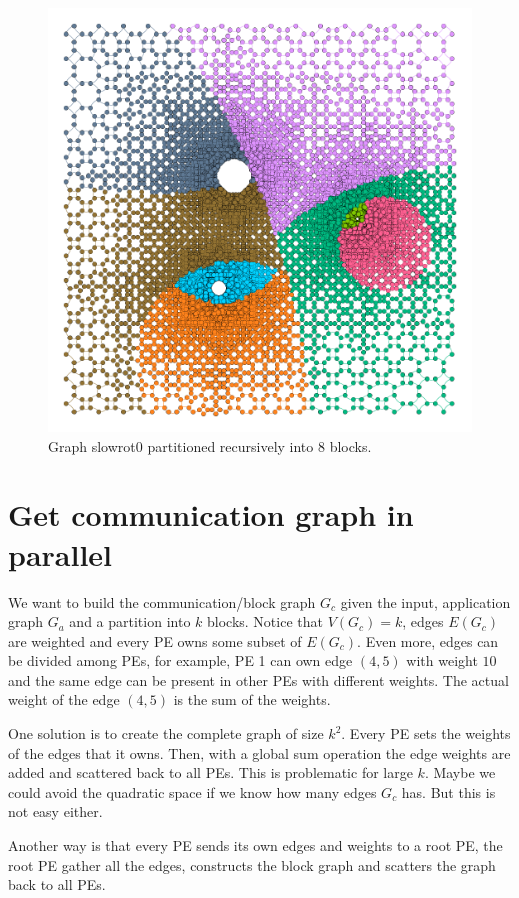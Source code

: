 \documentclass[a4paper,10pt]{article}
\begin{document}
\begin{figure}
\includegraphics[scale=0.2]{slowrot_RecursiveKMeans_k8}
\caption{Graph slowrot0 partitioned recursively into 8 blocks. }
\end{figure}



\section*{Get communication graph in parallel}

We want to build the communication/block graph $G_c$ given the input, application graph $G_a$ and a
partition into $k$ blocks. Notice that $V(G_c)=k$, edges $E(G_c)$ are weighted and every PE owns some subset 
of $E(G_c)$. Even more,
edges can be divided among PEs, for example, PE 1 can own edge $(4,5)$ with weight $10$ and the same
edge can be present in other PEs with different weights. The actual weight of the edge $(4,5)$ is the
sum of the weights.

One solution is to create the complete graph of size $k^2$. Every PE sets the weights of the edges that
it owns. Then, with a global sum operation the edge weights are added and scattered back to all PEs.
This is problematic for large $k$.
Maybe we could avoid the quadratic space if we know how many edges $G_c$ has. But this is not easy either.

Another way is that every PE sends its own edges and weights to a root PE, the root PE gather all the
edges, constructs the block graph and scatters the graph back to all PEs.
\end{document}
